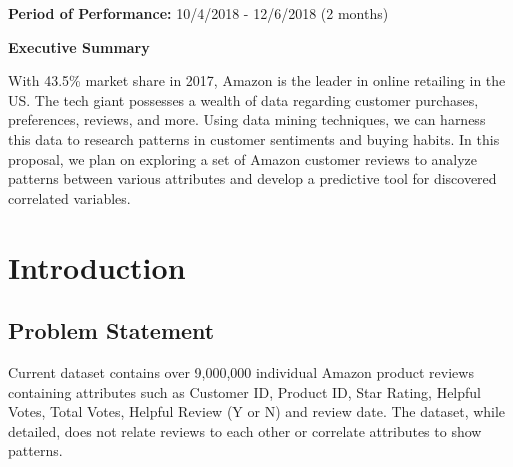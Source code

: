 \documentclass[12pt]{article}
\begin{document}
\begin{flushleft}

	\item{\bfseries Period of Performance:} 10/4/2018 - 12/6/2018 (2 months)\\[48pt]

	\begin{center}
		\Large{\bfseries Executive Summary }\\[11pt]
	\end{center}

\end{flushleft}

With 43.5\% market share in 2017, Amazon is the leader in online retailing in the US. The tech giant possesses a wealth of data regarding customer purchases, preferences, reviews, and more. Using data mining techniques, we can harness this data to research patterns in customer sentiments and buying habits. In this proposal, we plan on exploring a set of Amazon customer reviews to analyze patterns between various attributes and develop a predictive tool for discovered correlated variables. \\[2pt]


\newpage\tableofcontents


\newpage
{}
\clearpage
\setcounter{page}{1}

\section{Introduction}

	\subsection{Problem Statement}\hspace{4ex} Current dataset contains over 9,000,000 individual Amazon product reviews containing attributes such as Customer ID, Product ID, Star Rating, Helpful Votes, Total Votes, Helpful Review (Y or N) and review date. The dataset, while detailed, does not relate reviews to each other or correlate attributes to show patterns.   
	
	
\end{document}
